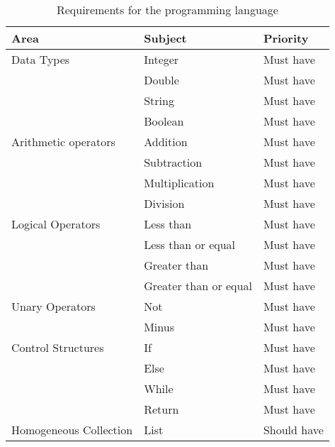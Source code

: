 \begin{table}[H]
\begin{tabular}{@{}lll@{}}
\toprule
\caption{Requirements for the programming language}
\textbf{Area}          & \textbf{Subject}      & \textbf{Priority}               \\ \midrule
Data Types             & Integer               & Must have                       \\
                       & Double                & Must have                       \\
                       & String                & Must have                       \\
                       & Boolean               & Must have                       \\ \midrule
Arithmetic operators   & Addition              & Must have                       \\
                       & Subtraction           & Must have                       \\
                       & Multiplication        & Must have                       \\
                       & Division              & Must have                       \\ \midrule
Logical Operators      & Less than             & Must have                       \\
                       & Less than or equal    & Must have                       \\
                       & Greater than          & Must have                       \\
                       & Greater than or equal & Must have                       \\ \midrule
Unary Operators        & Not                   & Must have                       \\
                       & Minus                 & Must have                       \\ \midrule
Control Structures     & If                    & Must have                       \\
                       & Else                  & Must have                       \\
                       & While                 & Must have                       \\
                       & Return                & Must have                       \\ \midrule
Homogeneous Collection & List                  & Should have                     \\ \midrule

\end{tabular}
\end{table}
